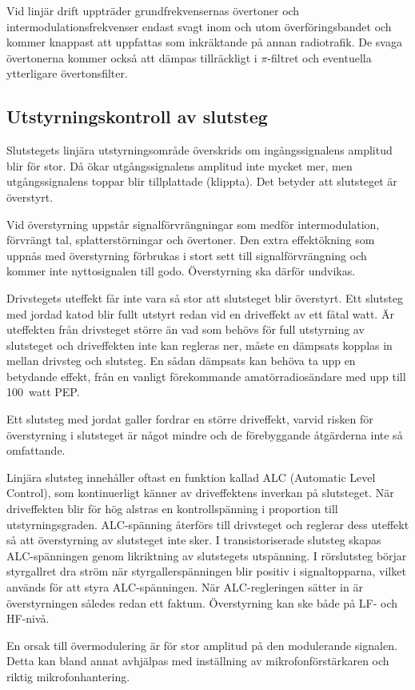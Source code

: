Vid linjär drift uppträder grundfrekvensernas övertoner och
intermodulationsfrekvenser endast svagt inom och utom
överföringsbandet och kommer knappast att uppfattas som inkräktande på
annan radiotrafik.
De svaga övertonerna kommer också att dämpas tillräckligt i \(\pi \)-filtret
och eventuella ytterligare övertonsfilter.


\subsection{Utstyrningskontroll av slutsteg}

Slutstegets linjära utstyrningsområde överskrids om ingångssignalens
amplitud blir för stor.
Då ökar utgångssignalens amplitud inte mycket mer, men utgångssignalens toppar
blir tillplattade (klippta).
Det betyder att slutsteget är överstyrt.

Vid överstyrning uppstår signalförvrängningar som medför intermodulation,
förvrängt tal, splatterstörningar och övertoner.
Den extra effektökning som uppnås med överstyrning förbrukas i stort sett
till signalförvrängning och kommer inte nyttosignalen till godo.
Överstyrning ska därför undvikas.

Drivstegets uteffekt får inte vara så stor att slutsteget blir överstyrt.
Ett slutsteg med jordad katod blir fullt utstyrt redan vid en driveffekt av ett
fåtal watt.
Är uteffekten från drivsteget större än vad som behövs för full utstyrning av
slutsteget och driveffekten inte kan regleras ner, måste en dämpsats
kopplas in mellan drivsteg och slutsteg.
En sådan dämpsats kan behöva ta upp en betydande effekt, från en vanligt
förekommande amatörradiosändare med upp till 100~watt PEP.

Ett slutsteg med jordat galler fordrar en större driveffekt, varvid
risken för överstyrning i slutsteget är något mindre och de
förebyggande åtgärderna inte så omfattande.

Linjära slutsteg innehåller oftast en funktion kallad ALC (Automatic Level
Control), som kontinuerligt känner av driveffektens inverkan på slutsteget.
När driveffekten blir för hög alstras en kontrollspänning i proportion till
utstyrningsgraden.
ALC-spänning återförs till drivsteget och reglerar dess uteffekt så att
överstyrning av slutsteget inte sker.
I transistoriserade slutsteg skapas ALC-spänningen genom likriktning av
slutstegets utspänning.
I rörslutsteg börjar styrgallret dra ström när styrgallerspänningen
blir positiv i signaltopparna, vilket används för att styra ALC-spänningen.
När ALC-regleringen sätter in är överstyrningen således redan ett faktum.
Överstyrning kan ske både på LF- och HF-nivå.

En orsak till övermodulering är för stor amplitud på den modulerande signalen.
Detta kan bland annat avhjälpas med inställning av mikrofonförstärkaren och
riktig mikrofonhantering.
